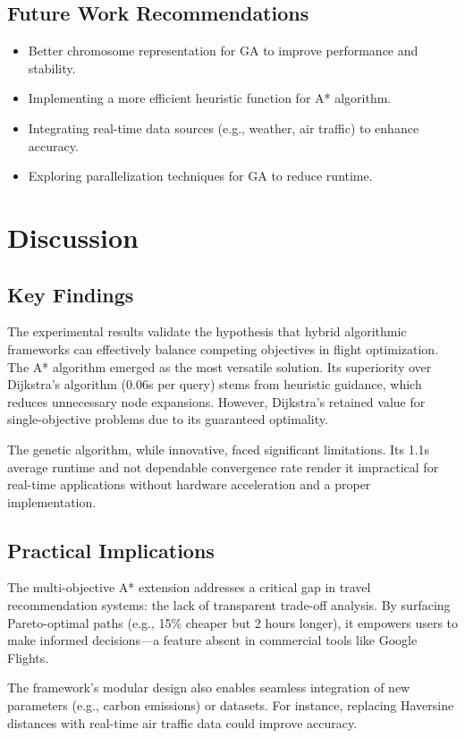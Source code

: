 \documentclass[conference]{IEEEtran}
\begin{document}
\subsection{Future Work Recommendations}
\begin{itemize}
    \item Better chromosome representation for GA to improve performance and stability.
    \item Implementing a more efficient heuristic function for A* algorithm.
    \item Integrating real-time data sources (e.g., weather, air traffic) to enhance accuracy.
    \item Exploring parallelization techniques for GA to reduce runtime.
\end{itemize}


\section{Discussion}

\subsection{Key Findings}
The experimental results validate the hypothesis that hybrid algorithmic frameworks can effectively balance competing objectives in flight optimization. The A* algorithm emerged as the most versatile solution. 
Its superiority over Dijkstra’s algorithm (0.06s per query) stems from heuristic guidance, which reduces unnecessary node expansions. However, Dijkstra’s retained value for single-objective problems due to its guaranteed optimality.  

The genetic algorithm, while innovative, faced significant limitations. Its 1.1s average runtime and not dependable convergence rate render it impractical for real-time applications without hardware acceleration and a proper implementation. 

\subsection{Practical Implications}
The multi-objective A* extension addresses a critical gap in travel recommendation systems: the lack of transparent trade-off analysis. By surfacing Pareto-optimal paths (e.g., 15\% cheaper but 2 hours longer), it empowers users to make informed decisions—a feature absent in commercial tools like Google Flights.  

The framework’s modular design also enables seamless integration of new parameters (e.g., carbon emissions) or datasets. For instance, replacing Haversine distances with real-time air traffic data could improve accuracy.  
\end{document}
